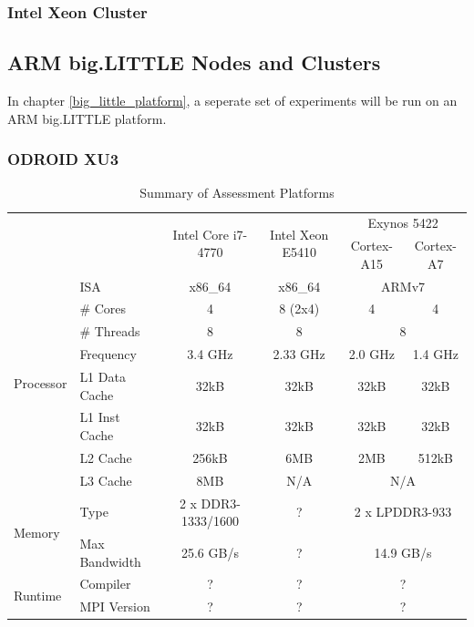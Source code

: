 \documentclass[11pt]{book}
\begin{document}
\subsubsection{Intel Xeon Cluster}

\subsection{ARM big.LITTLE Nodes and Clusters}

In chapter \ref{big_little_platform}, a seperate set of experiments will be run on an
ARM big.LITTLE platform. 

\subsubsection{ODROID XU3}


\pagebreak

\begin{center}\begin{table}
    \begin{tabular}{|| l | l | c | c | c c ||}
    \hline
        \multicolumn{2}{|l|}{} & \multirow{2}{*}{Intel Core i7-4770} &
            \multirow{2}{*}{Intel Xeon E5410} & \multicolumn{2}{c||}{Exynos 5422} \\ \cline{5-6}
        \multicolumn{2}{|l|}{} & & & Cortex-A15 & Cortex-A7 \\ [0.5ex]
        \hline\hline
        \multirow{8}{*}{Processor}
            & ISA           & x86\_64   & x86\_64   & \multicolumn{2}{c||}{ARMv7} \\
            & \# Cores      & 4         & 8 (2x4)   & 4         & 4 \\
            & \# Threads    & 8         & 8         & \multicolumn{2}{c||}{8} \\
            & Frequency     & 3.4 GHz   & 2.33 GHz  & 2.0 GHz   & 1.4 GHz \\
            & L1 Data Cache & 32kB      & 32kB      & 32kB      & 32kB \\
            & L1 Inst Cache & 32kB      & 32kB      & 32kB      & 32kB \\
            & L2 Cache      & 256kB     & 6MB       & 2MB       & 512kB\\
            & L3 Cache      & 8MB       & N/A       & \multicolumn{2}{c||}{N/A} \\
        \hline
        \multirow{2}{*}{Memory}
            & Type          & 2 x DDR3-1333/1600    & ? & \multicolumn{2}{c||}{2 x LPDDR3-933} \\
            & Max Bandwidth & 25.6 GB/s             & ? & \multicolumn{2}{c||}{14.9 GB/s} \\
        \hline
        \multirow{2}{*}{Runtime}
            & Compiler      & ? & ? & \multicolumn{2}{c||}{?} \\
            & MPI Version   & ? & ? & \multicolumn{2}{c||}{?} \\
        \hline
    \end{tabular}
    \caption{Summary of Assessment Platforms}\label{platform_table}
\end{table}\end{center}
\end{document}
